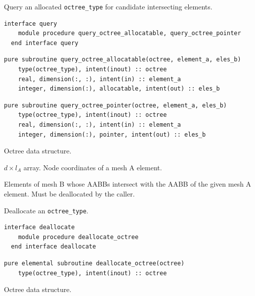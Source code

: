 \documentclass{article}
\begin{document}
\noindent Query an allocated \verb+octree_type+ for candidate intersecting
elements.
  
\begin{lstlisting}[language=FORTRAN]
  interface query
    module procedure query_octree_allocatable, query_octree_pointer
  end interface query
\end{lstlisting}
    
\begin{lstlisting}[language=FORTRAN]
  pure subroutine query_octree_allocatable(octree, element_a, eles_b)
    type(octree_type), intent(inout) :: octree
    real, dimension(:, :), intent(in) :: element_a
    integer, dimension(:), allocatable, intent(out) :: eles_b
\end{lstlisting}
  
\begin{lstlisting}[language=FORTRAN]
  pure subroutine query_octree_pointer(octree, element_a, eles_b)
    type(octree_type), intent(inout) :: octree
    real, dimension(:, :), intent(in) :: element_a
    integer, dimension(:), pointer, intent(out) :: eles_b
\end{lstlisting}

\begin{description}[font=\ttfamily\bfseries,leftmargin=2.2\parindent,labelindent=1.7\parindent,noitemsep]
  \item[octree] Octree data structure.
  \item[element\_a] $d \times l_A$ array. Node coordinates of a mesh A element.
  \item[eles\_b] Elements of mesh B whose AABBs intersect with the AABB of the
    given mesh A element. Must be deallocated by the caller.
\end{description}

\noindent Deallocate an \verb+octree_type+.
  
\begin{lstlisting}[language=FORTRAN]
  interface deallocate
    module procedure deallocate_octree
  end interface deallocate
\end{lstlisting}
  
\begin{lstlisting}[language=FORTRAN]
  pure elemental subroutine deallocate_octree(octree)
    type(octree_type), intent(inout) :: octree
\end{lstlisting}

\begin{description}[font=\ttfamily\bfseries,leftmargin=2.2\parindent,labelindent=1.7\parindent,noitemsep]
  \item[octree] Octree data structure.
\end{description}
\end{document}
